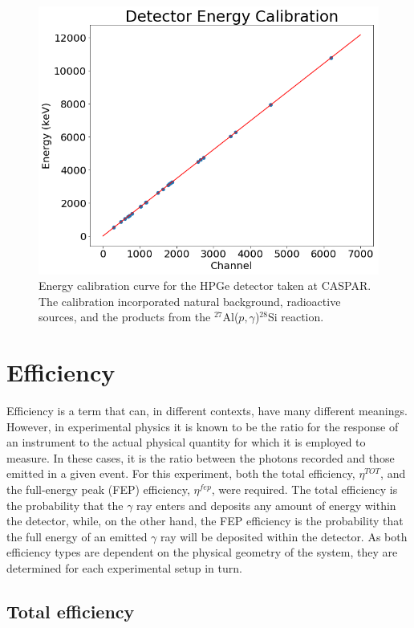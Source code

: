 \begin{figure}
\centering
\includegraphics[width=0.8\linewidth]{figures/detEnergyCalibration.png}
\caption{Energy calibration curve for the HPGe detector taken at CASPAR. The calibration incorporated natural background, radioactive sources, and the products from the $^{27}$Al($p, \gamma$)$^{28}$Si reaction. }
\label{fig: energyCalibration}
\end{figure}





\section{Efficiency}
\label{sec: efficiency}

Efficiency is a term that can, in different contexts, have many different meanings. However, in experimental physics it is known to be the ratio for the response of an instrument to the actual physical quantity for which it is employed to measure. In these cases, it is the ratio between the photons recorded and those emitted in a given event. For this experiment, both the total efficiency, $\eta^{TOT}$, and the full-energy peak (FEP) efficiency, $\eta^{fep}$, were required. The total efficiency is the probability that the $\gamma$ ray enters and deposits any amount of energy within the detector, while, on the other hand, the FEP efficiency is the probability that the full energy of an emitted $\gamma$ ray will be deposited within the detector. As both efficiency types are dependent on the physical geometry of the system, they are determined for each experimental setup in turn. 

\subsection{Total efficiency}
\label{subsec: totEff}


